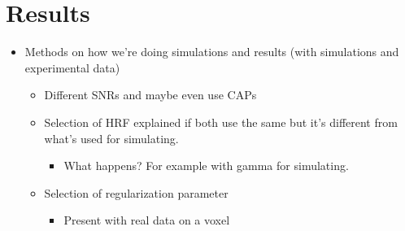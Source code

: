 \section{Results}

\begin{itemize}
    \item Methods on how we're doing simulations and results (with simulations and experimental data)
    \begin{itemize}
        \item Different SNRs and maybe even use CAPs
        \item Selection of HRF explained if both use the same but it's different from what's used for simulating.
        \begin{itemize}
            \item What happens? For example with gamma for simulating.
        \end{itemize}
        \item Selection of regularization parameter
        \begin{itemize}
            \item Present with real data on a voxel
        \end{itemize}
    \end{itemize}
\end{itemize}
